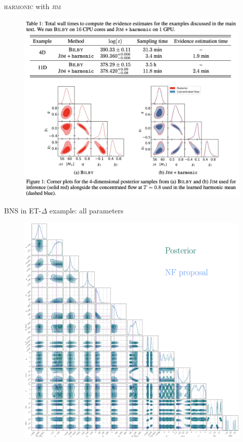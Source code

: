 \documentclass[usenames,dvipsnames,t]{beamer}
\begin{document}
\begin{frame}{\textsc{harmonic} with \textsc{jim}}
  \begin{figure}
    \centering
    \includegraphics[scale=0.275]{Figures/polanska.jpg}
  \end{figure}
  
\end{frame}

\begin{frame}{BNS in ET-$\Delta$ example: all parameters}
  \vspace{-3mm}
  \begin{figure}
    \centering
    \includegraphics[scale=0.1125]{Figures/corner_plot_big.pdf}
  \end{figure}
\end{frame}
\end{document}
